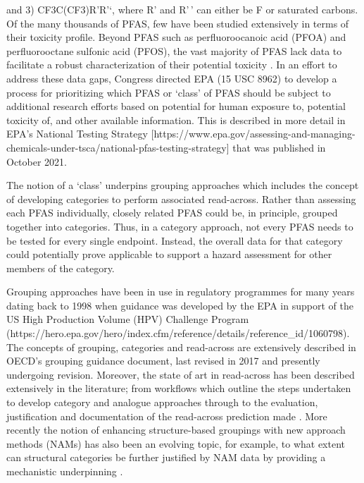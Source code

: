 \documentclass[
  super,
  preprint,
  3p]{elsarticle}
\begin{document}
and 3) CF3C(CF3)R'R'`, where R' and R'\,' can either be F or saturated
carbons. Of the many thousands of PFAS, few have been studied
extensively in terms of their toxicity profile. Beyond PFAS such as
perfluoroocanoic acid (PFOA) and perfluorooctane sulfonic acid (PFOS),
the vast majority of PFAS lack data to facilitate a robust
characterization of their potential toxicity
\citep{carlson_systematic_2022}. In an effort to address these data
gaps, Congress directed EPA (15 USC 8962) to develop a process for
prioritizing which PFAS or `class' of PFAS should be subject to
additional research efforts based on potential for human exposure to,
potential toxicity of, and other available information. This is
described in more detail in EPA's National Testing Strategy
{[}https://www.epa.gov/assessing-and-managing-chemicals-under-tsca/national-pfas-testing-strategy{]}
that was published in October 2021.

The notion of a `class' underpins grouping approaches which includes the
concept of developing categories to perform associated read-across.
Rather than assessing each PFAS individually, closely related PFAS could
be, in principle, grouped together into categories. Thus, in a category
approach, not every PFAS needs to be tested for every single endpoint.
Instead, the overall data for that category could potentially prove
applicable to support a hazard assessment for other members of the
category.

Grouping approaches have been in use in regulatory programmes for many
years dating back to 1998 when guidance was developed by the EPA in
support of the US High Production Volume (HPV) Challenge Program
(https://hero.epa.gov/hero/index.cfm/reference/details/reference\_id/1060798).
The concepts of grouping, categories and read-across are extensively
described in OECD's grouping guidance document, last revised in 2017
\citep{oecd_guidance_2017} and presently undergoing revision. Moreover,
the state of art in read-across has been described extensively in the
literature; from workflows which outline the steps undertaken to develop
category and analogue approaches through to the evaluation,
justification and documentation of the read-across prediction made
\citep{cronin_chapter_2013, escher_towards_2019, patlewicz_navigating_2018, patlewicz_towards_2023}.
More recently the notion of enhancing structure-based groupings with new
approach methods (NAMs) has also been an evolving topic, for example, to
what extent can structural categories be further justified by NAM data
by providing a mechanistic underpinning
\citep{escher_towards_2019, patlewicz_navigating_2018, patlewicz_towards_2022, patlewicz_towards_2023}.
\end{document}
